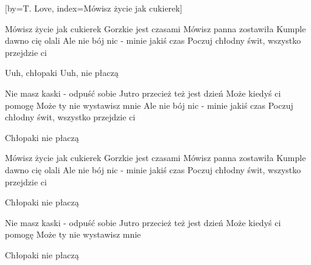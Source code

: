 [by={T. Love},
                     index={Mówisz życie jak cukierek}]
\beginverse

Mówisz życie jak cukierek
Gorzkie jest czasami
Mówisz panna zostawiła
Kumple dawno cię olali
Ale nie bój nic - minie jakiś czas
Poczuj chłodny świt, wszystko przejdzie ci

\endverse
\beginverse

Uuh, chłopaki
Uuh, nie płaczą

\endverse
\beginverse

Nie masz kaski - odpuść sobie
Jutro przecież też jest dzień
Może kiedyś ci pomogę
Może ty nie wystawisz mnie
Ale nie bój nic - minie jakiś czas
Poczuj chłodny świt, wszystko przejdzie ci

\endverse
\beginverse

Chłopaki nie płaczą

\endverse
\beginverse

Mówisz życie jak cukierek
Gorzkie jest czasami
Mówisz panna zostawiła
Kumple dawno cię olali
Ale nie bój nic - minie jakiś czas
Poczuj chłodny świt, wszystko przejdzie ci

\endverse
\beginverse

Chłopaki nie płaczą

\endverse
\beginverse

Nie masz kaski - odpuść sobie
Jutro przecież też jest dzień
Może kiedyś ci pomogę
Może ty nie wystawisz mnie

\endverse
\beginverse

Chłopaki nie płaczą

\endverse
\endsong